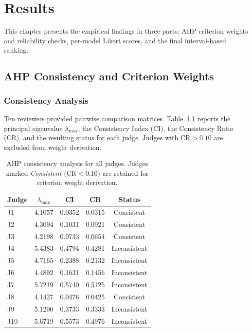 \chapter{Results}
\label{ch:results}

This chapter presents the empirical findings in three parts: AHP criterion weights
and reliability checks, per-model Likert scores, and the final interval-based
ranking.

\section{AHP Consistency and Criterion Weights}
\label{sec:res-ahp}

\subsection{Consistency Analysis}
\label{subsec:res-consistency}

Ten reviewers provided pairwise comparison matrices. Table~\ref{tab:cr} reports the
principal eigenvalue $\lambda_{\max}$, the Consistency Index (CI), the Consistency
Ratio (CR), and the resulting status for each judge. Judges with $\mathrm{CR} > 0.10$
are excluded from weight derivation.

\begin{table}[H]
  \centering
  \caption{AHP consistency analysis for all judges. Judges marked \emph{Consistent}
    ($\mathrm{CR} < 0.10$) are retained for criterion weight derivation.}
  \label{tab:cr}
  \begin{tabular}{lcccc}
    \toprule
    Judge & $\lambda_{\max}$ & CI & CR & Status \\
    \midrule
    J1  & 4.1057 & 0.0352 & 0.0315 & Consistent \\
    J2  & 4.3094 & 0.1031 & 0.0921 & Consistent \\
    J3  & 4.2198 & 0.0733 & 0.0654 & Consistent \\
    J4  & 5.4383 & 0.4794 & 0.4281 & Inconsistent \\
    J5  & 4.7165 & 0.2388 & 0.2132 & Inconsistent \\
    J6  & 4.4892 & 0.1631 & 0.1456 & Inconsistent \\
    J7  & 5.7219 & 0.5740 & 0.5125 & Inconsistent \\
    J8  & 4.1427 & 0.0476 & 0.0425 & Consistent \\
    J9  & 5.1200 & 0.3733 & 0.3333 & Inconsistent \\
    J10 & 5.6719 & 0.5573 & 0.4976 & Inconsistent \\
    \bottomrule
  \end{tabular}
\end{table}

